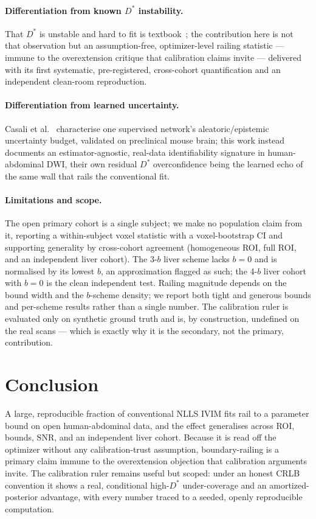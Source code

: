 \documentclass[11pt]{article}
\newcommand{\Ds}{D^{*}}
\begin{document}
\paragraph{Differentiation from known $\Ds$ instability.} That $\Ds$ is unstable
and hard to fit is textbook~\cite{koh2011,lemke2011}; the contribution here is not
that observation but an assumption-free, optimizer-level railing statistic ---
immune to the overextension critique that calibration claims invite --- delivered
with its first systematic, pre-registered, cross-cohort quantification and an
independent clean-room reproduction.

\paragraph{Differentiation from learned uncertainty.} Casali et
al.~\cite{casali2026} characterise one supervised network's aleatoric/epistemic
uncertainty budget, validated on preclinical mouse brain; this work instead
documents an estimator-agnostic, real-data identifiability signature in
human-abdominal DWI, their own residual $\Ds$ overconfidence being the learned
echo of the same wall that rails the conventional fit.

\paragraph{Limitations and scope.} The open primary cohort is a single subject;
we make no population claim from it, reporting a within-subject voxel statistic
with a voxel-bootstrap CI and supporting generality by cross-cohort agreement
(homogeneous ROI, full ROI, and an independent liver cohort). The 3-$b$ liver
scheme lacks $b{=}0$ and is normalised by its lowest $b$, an approximation flagged
as such; the 4-$b$ liver cohort with $b{=}0$ is the clean independent test.
Railing magnitude depends on the bound width and the $b$-scheme density; we report
both tight and generous bounds and per-scheme results rather than a single number.
The calibration ruler is evaluated only on synthetic ground truth and is, by
construction, undefined on the real scans --- which is exactly why it is the
secondary, not the primary, contribution.

\section{Conclusion}

A large, reproducible fraction of conventional NLLS IVIM fits rail to a parameter
bound on open human-abdominal data, and the effect generalises across ROI, bounds,
SNR, and an independent liver cohort. Because it is read off the optimizer without
any calibration-trust assumption, boundary-railing is a primary claim immune to
the overextension objection that calibration arguments invite. The calibration
ruler remains useful but scoped: under an honest CRLB convention it shows a real,
conditional high-$\Ds$ under-coverage and an amortized-posterior advantage, with
every number traced to a seeded, openly reproducible computation.
\end{document}
